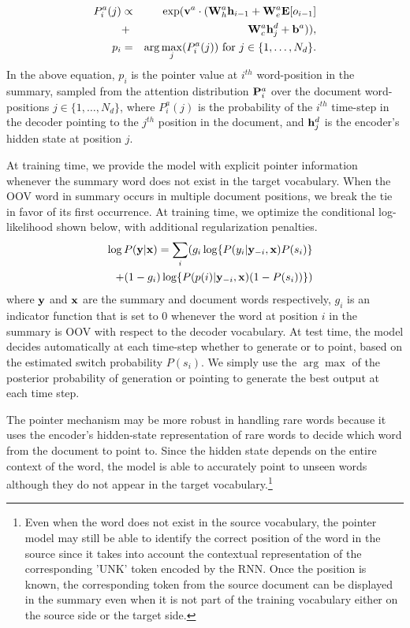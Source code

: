 \documentclass[11pt]{article}
\begin{document}
\begin{eqnarray}
P^a_i(j)    &\propto&  \exp({{\bf v}^a}\cdot({\bf W}_h^a{\bf h}_{i-1} + {\bf W}^a_e{\bf E}[o_{i-1}] \nonumber\\
            &+& {\bf W}^a_c{\bf h}^d_j + {\bf b}^a)), \nonumber \\
 p_i &=& \arg\max_j (P^a_i(j))~\mbox{for}~j \in \{1,\ldots,N_d\}\nonumber.
\end{eqnarray}
In the above equation, $p_i$ is the pointer value at $i^{th}$ word-position in the summary, sampled from the attention distribution ${\bf P}^a_i$ over the document word-positions $j \in \{1,\ldots,N_d\}$, where $P^a_i(j)$ is the probability of the $i^{th}$ time-step in the decoder pointing to the $j^{th}$ position in the document, and ${\bf h}^d_j$ is the encoder's hidden state at position $j$. 

At training time, we provide the model with explicit pointer information whenever the summary word does not exist in the target vocabulary. When the OOV word in summary occurs in multiple document positions, we break the tie in favor of its first occurrence. At training time, we optimize the conditional log-likelihood shown below, with additional regularization penalties.
\begin{eqnarray}
&& \log P({\bf y}|{\bf x}) = \sum_i (g_i\log \{P(y_i | {\bf y}_{-i}, {\bf x})P(s_i)\} \nonumber\\
 &&+  (1-g_i)\log\{P(p(i)|{\bf y}_{-i},{\bf x})(1-P(s_i))\})\nonumber
\end{eqnarray}
where ${\bf y}$ and ${\bf x}$ are the summary and document words respectively, $g_i$ is an indicator function that is set to 0 whenever the word at position $i$ in the summary is OOV with respect to the decoder vocabulary. At test time, the model decides automatically at each time-step whether to generate or to point, based on the estimated switch probability $P(s_i)$.  We simply use the $\arg\max $ of the posterior probability of generation or pointing to generate the best output at each time step.

The pointer mechanism may be more robust in handling rare words because it uses the encoder's hidden-state representation of rare words to decide which word from the document to point to. Since the hidden state depends on the entire context of the word, the model is able to accurately point to unseen words although they do not appear in the target vocabulary.\footnote{Even when the word does not exist in the source vocabulary, the pointer model may still be able to identify the correct position of the word in the source since it takes into account the contextual representation of the corresponding 'UNK' token encoded by the RNN. Once the position is known, the corresponding token from the source document can be displayed in the summary even when it is not part of the training vocabulary either on the source side or the target side.}  
\end{document}
